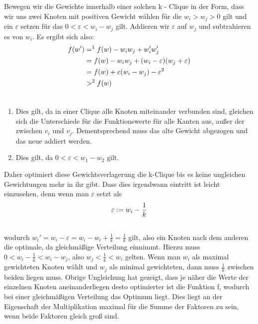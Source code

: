 \documentclass[12pt, a4paper]{article}
\begin{document}
Bewegen wir die Gewichte innerhalb einer solchen k - Clique in der Form, dass wir uns zwei Knoten mit positiven Gewicht wählen für die $w_i > w_j > 0$ gilt und ein $\varepsilon$ setzen für das $0 < \varepsilon < w_i - w_j$ gilt. Addieren wir $\varepsilon$ auf $w_j$ und subtrahieren es von $w_i$. Es ergibt sich also:
\begin{gather}
\begin{split}f(w') &=^1 f(w) - w_i w_j + w'_i w'_j \\
&= f(w) - w_i w_j + (w_i - \varepsilon)(w_j + \varepsilon) \\
&= f(w) + \varepsilon (w_i - w_j) - \varepsilon^2 \\
&>^2 f(w)\end{split}\notag\\\begin{split}\end{split}\notag
\end{gather}\begin{enumerate}
\item {}
Dies gilt, da in einer Clique alle Knoten miteinander verbunden sind, gleichen sich die Unterschiede für die Funktionswerte für alle Kanten aus, außer der zwischen $v_i$ und $v_j$. Dementsprechend muss das alte Gewicht abgezogen und das neue addiert werden.

\item {}
Dies gilt, da $0 < \varepsilon < w_1 - w_2$ gilt.

\end{enumerate}

Daher optimiert diese Gewichtsverlagerung die k-Clique bis es keine ungleichen Gewichtungen mehr in ihr gibt.
Dass dies irgendwann eintritt ist leicht einzusehen, denn wenn man $\varepsilon$ setzt als
\begin{gather}
\begin{split}\varepsilon := w_i - \frac{1}{k}\end{split}\notag\\\begin{split}\end{split}\notag
\end{gather}
wodurch $w_i' = w_i - \varepsilon = w_i - w_i + \frac{1}{k} = \frac{1}{k}$ gilt, also ein Knoten nach dem anderen die optimale, da gleichmäßige Verteilung einnimmt. Hierzu muss $0 < w_i - \frac{1}{k} < w_i - w_j$, also $w_j < \frac{1}{k} < w_i$ gelten. Wenn man $w_i$ als maximal gewichteten Knoten wählt und $w_j$ als minimal gewichteten, dann muss $\frac{1}{k}$ zwischen beiden liegen muss. Obrige Ungleichung hat gezeigt, dass je näher die Werte der einzelnen Knoten aneinanderliegen desto optimierter ist die Funktion f, wodurch bei einer gleichmäßigen Verteilung das Optimum liegt. Dies liegt an der Eigenschaft der Multiplikation maximal für die Summe der Faktoren zu sein, wenn beide Faktoren gleich groß sind.
\end{document}
